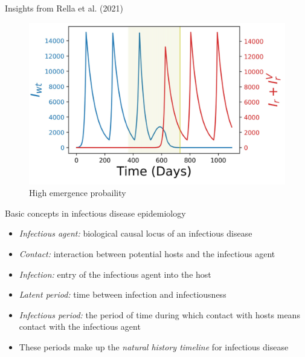 \documentclass[
  11pt,
  ignorenonframetext,
]{beamer}
\providecommand{\tightlist}{%
  \setlength{\itemsep}{0pt}\setlength{\parskip}{0pt}}\usepackage{longtable,booktabs,array}
\begin{document}
\begin{frame}{Insights from Rella et al. (2021)}
\protect\hypertarget{insights-from-rella_2021-1}{}
\begin{figure}

{\centering \includegraphics{resources/Rella_2021_fig1c.png}

}

\caption{High emergence probaility}

\end{figure}
\end{frame}

\begin{frame}{Basic concepts in infectious disease epidemiology}
\protect\hypertarget{basic-concepts-in-infectious-disease-epidemiology}{}
\begin{itemize}
\tightlist
\item
  \emph{Infectious agent:} biological causal locus of an infectious
  disease
\item
  \emph{Contact:} interaction between potential hosts and the infectious
  agent
\item
  \emph{Infection:} entry of the infectious agent into the host
\item
  \emph{Latent period:} time between infection and infectiousness
\item
  \emph{Infectious period:} the period of time during which contact with
  hosts means contact with the infectious agent
\item
  These periods make up the \emph{natural history timeline} for
  infectious disease
\end{itemize}
\end{frame}
\end{document}
